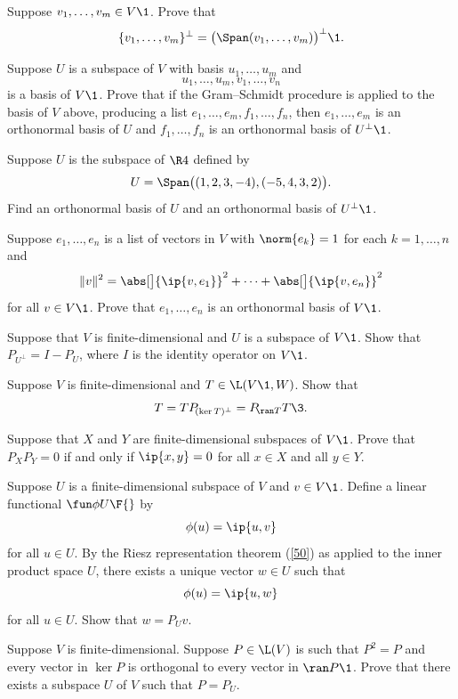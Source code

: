 
\exercise
Suppose $v_1, \dots, v_m \in V\1$. Prove that
\[
\{v_1, \dots, v_m\}^\perp = \bigl( \Span(v_1, \dots, v_m) \bigr)^\perp\1.
\]
\exercisedisplayend


\exercise
Suppose $U$ is a subspace of $V$ with basis $u_1, \dots, u_m$ and\label{6onbasis}
\[
u_1, \dots, u_m, v_1, \dots, v_n
\]
is a basis of $V\1$. Prove that if the Gram--Schmidt procedure is applied to the basis of $V$ above, producing a list $e_1, \dots, e_m, f_1, \dots, f_n$, then $e_1, \dots, e_m$ is an orthonormal basis of $U$ and $f_1, \dots, f_n$ is an orthonormal basis of $U^\perp\1$.


\exercise
Suppose $U$ is the subspace of $\R4$ defined by
\[
U = \Span\bigl( (1,2,3,-4), (-5,4, 3, 2) \bigr).
\]
Find an orthonormal basis of $U$ and an orthonormal basis of $U^\perp\1$.


\exercise
Suppose $e_1, \ldots, e_n$ is a list of vectors in $V$ with $\norm{e_k} = 1$ for each $k=1, \ldots, n$ and \label{190converse}
\[
\|v\|^2 = \abs[\big]{ \ip{v, e_1} }^2  + \dots + \abs[\big]{ \ip{v, e_n} }^2
\]
for all $v \in V\1$. Prove that $e_1, \ldots, e_n$ is an orthonormal basis of $V\1$.


\exercise
Suppose that $V$ is finite-dimensional and $U$ is a subspace of $V\1$. Show that
$P_{\!U^\perp} = I - P_{\!U}$, where $I$ is the identity operator on $V\1$.


\exercise
Suppose $V$ is finite-dimensional and $T \in \L(V\1, W)$. Show that
\[
T = TP_{\!(\ker T)^\perp}= P_{\!\ran T} T\3.
\]
\exercisedisplayend


\exercise
Suppose that $X$ and $Y$ are finite-dimensional subspaces of $V\1$. Prove that $P_{\!X} P_{\!Y} = 0$ if and only if $\ip{x, y} = 0$ for all $x \in X$ and all $y \in Y$.


\exercise
Suppose $U$ is a finite-dimensional subspace of $V$ and $v \in V\1$. Define a linear functional $\fun \phi U \F{}$ by
\[
\phi(u) = \ip{u, v}
\]
for all $u \in U$. By the Riesz representation theorem (\ref{50}) as applied to the inner product space $U$, there exists a unique vector
$w \in U$ such that
\[
\phi(u) = \ip{u, w}
\]
for all $u \in U$. Show that $w = P_{\!U} v$.


\exercise
Suppose $V$ is finite-dimensional. Suppose $P \in \L(V)$ is such that $P^2 = P$ and every vector in
$\ker P$ is orthogonal to every vector in $\ran P\1$. Prove that there exists a subspace $U$ of $V$ such that $P = P_{\!U}$.\label{6orth}


